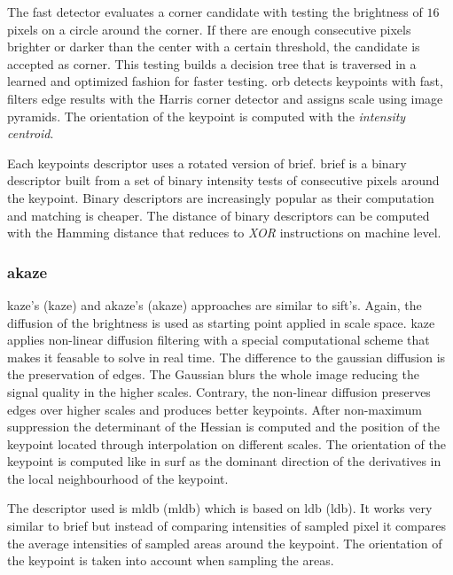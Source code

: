 The \acrshort{fast} detector evaluates a corner candidate with testing the brightness of $16$ pixels on a circle around the corner.
If there are enough consecutive pixels brighter or darker than the center with a certain threshold, the candidate is accepted as corner.
This testing builds a decision tree that is traversed in a learned and optimized fashion for faster testing.
\acrshort{orb} detects keypoints with \acrshort{fast}, filters edge results with the Harris corner detector\cite{harris_1988} and assigns scale using image pyramids.
The orientation of the keypoint is computed with the \emph{intensity centroid}\cite{rosin_cviu99}.

Each keypoints descriptor uses a rotated version of \acrshort{brief}.
\acrshort{brief} is a binary descriptor built from a set of binary intensity tests of consecutive pixels around the keypoint.
Binary descriptors are increasingly popular as their computation and matching is cheaper.
The distance of binary descriptors can be computed with the Hamming distance that reduces to \emph{XOR} instructions on machine level.

\subsubsection{\acrshort{akaze}}

\acrshort{kaze}'s\cite{alcantarilla_eccv12} (\acrlong{kaze}) and \acrshort{akaze}\cite{alcantarilla_bmva13}'s (\acrlong{akaze}) approaches are similar to \acrshort{sift}'s.
Again, the diffusion of the brightness is used as starting point applied in scale space.
\acrshort{kaze} applies non-linear diffusion filtering with a special computational scheme that makes it feasable to solve in real time.
The difference to the gaussian diffusion is the preservation of edges.
The Gaussian blurs the whole image reducing the signal quality in the higher scales.
Contrary, the non-linear diffusion preserves edges over higher scales and produces better keypoints.
After non-maximum suppression the determinant of the Hessian is computed and the position of the keypoint located through interpolation on different scales.
The orientation of the keypoint is computed like in \acrshort{surf} as the dominant direction of the derivatives in the local neighbourhood of the keypoint.

The descriptor used is \acrshort{mldb} (\acrlong{mldb}) which is based on \acrshort{ldb}\cite{yang_ismar12} (\acrlong{ldb}).
It works very similar to \acrshort{brief} but instead of comparing intensities of sampled pixel it compares the average intensities of sampled areas around the keypoint.
The orientation of the keypoint is taken into account when sampling the areas.
